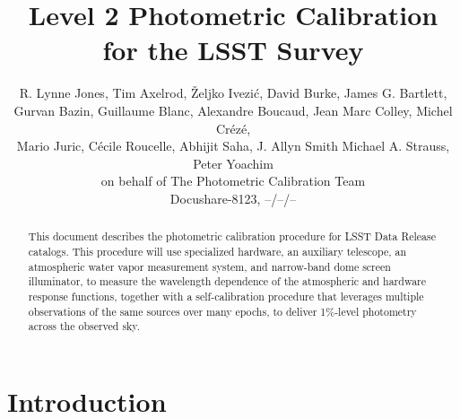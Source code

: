 \documentclass[12pt,preprint]{aastex}
\begin{document}
\title{Level 2 Photometric Calibration for the LSST Survey}

\author{
R. Lynne Jones, Tim Axelrod,
{\v Z}eljko Ivezi{\'c},   David Burke,
James G. Bartlett, \\
Gurvan Bazin,
Guillaume Blanc,
Alexandre Boucaud,
Jean Marc Colley,
Michel Cr{\'e}z{\'e}, \\ 
Mario Juric,
C{\'e}cile Roucelle, 
Abhijit Saha, 
J. Allyn Smith
Michael A. Strauss,
Peter Yoachim \\
on behalf of 
The Photometric Calibration Team \\ 
Docushare-8123, --/--/-- \\
}




\begin{abstract}
This document describes the photometric calibration procedure for LSST
Data Release catalogs. This procedure will use specialized hardware, 
an auxiliary telescope, an atmospheric water vapor measurement system, and narrow-band dome screen illuminator, to
measure the wavelength dependence of the atmospheric and hardware
response functions, together with a self-calibration procedure that
leverages multiple observations of the same sources over many epochs,
to deliver 1\%-level photometry across the observed sky.
\end{abstract}

\tableofcontents

\section{Introduction}
\end{document}
